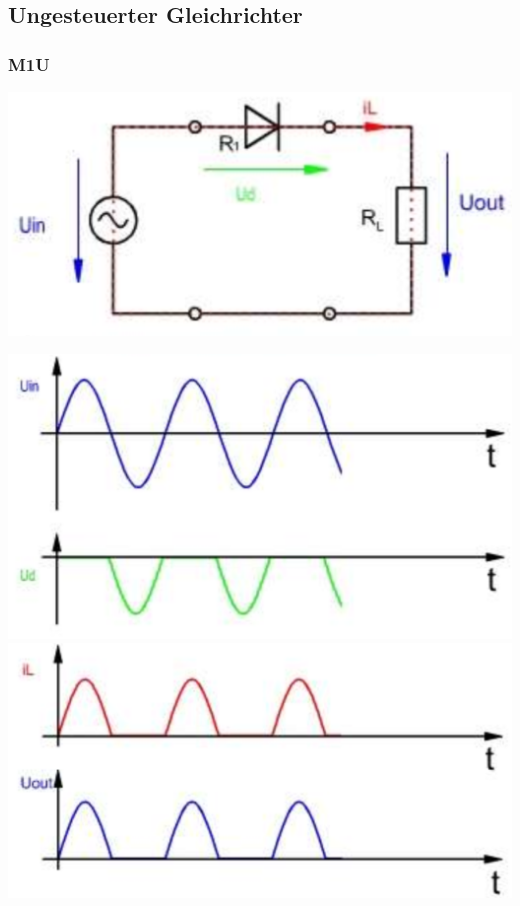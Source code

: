 \subsection{Ungesteuerter Gleichrichter}
\subsubsection{M1U}
\vspace{-0.5cm}
\begin{minipage}{0.4\linewidth}
    \includegraphics[width=\linewidth]{images/PrakUGM1}
\end{minipage}
\begin{minipage}{0.3\linewidth}
    \centering
   \includegraphics[width=0.7\linewidth]{images/PrakUGM1Kl1}
   \includegraphics[width=0.7\linewidth]{images/PrakUGM1Kl2}
\end{minipage}
